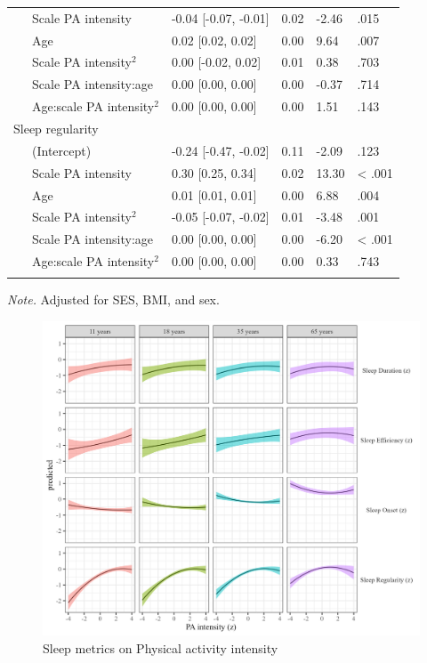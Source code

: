 \documentclass[
  man]{apa6}
\begin{document}
\begin{table}[tbp]
\begin{center}
\begin{threeparttable}
\begin{tabular}{lllll}
\ \ \ Scale PA intensity & -0.04 [-0.07, -0.01] & 0.02 & -2.46 & .015\\
\ \ \ Age & 0.02 [0.02, 0.02] & 0.00 & 9.64 & .007\\
\ \ \ Scale PA intensity$^2$ & 0.00 [-0.02, 0.02] & 0.01 & 0.38 & .703\\
\ \ \ Scale PA intensity:age & 0.00 [0.00, 0.00] & 0.00 & -0.37 & .714\\
\ \ \ Age:scale PA intensity$^2$ & 0.00 [0.00, 0.00] & 0.00 & 1.51 & .143\\
Sleep regularity &  &  &  & \\
\ \ \ (Intercept) & -0.24 [-0.47, -0.02] & 0.11 & -2.09 & .123\\
\ \ \ Scale PA intensity & 0.30 [0.25, 0.34] & 0.02 & 13.30 & < .001\\
\ \ \ Age & 0.01 [0.01, 0.01] & 0.00 & 6.88 & .004\\
\ \ \ Scale PA intensity$^2$ & -0.05 [-0.07, -0.02] & 0.01 & -3.48 & .001\\
\ \ \ Scale PA intensity:age & 0.00 [0.00, 0.00] & 0.00 & -6.20 & < .001\\
\ \ \ Age:scale PA intensity$^2$ & 0.00 [0.00, 0.00] & 0.00 & 0.33 & .743\\
\bottomrule
\addlinespace
\end{tabular}

\begin{tablenotes}[para]
\normalsize{\textit{Note.} Adjusted for SES, BMI, and sex. }
\end{tablenotes}

\end{threeparttable}
\end{center}

\end{table}

\begin{figure}
\includegraphics[width=7.08in]{../Figures/sleep on pa_intensity} \caption{Sleep metrics on Physical activity intensity}\label{fig:sleep-by-intensity-fig}
\end{figure}
\end{document}

